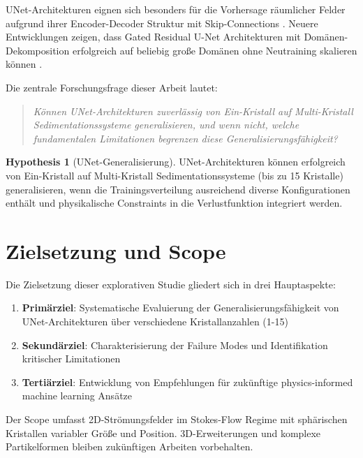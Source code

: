 \documentclass[12pt,twoside,openright]{scrreprt}
\theoremstyle{definition}
\newtheorem{hypothesis}{Hypothesis}[chapter]
\theoremstyle{plain}
\begin{document}
UNet-Architekturen eignen sich besonders für die Vorhersage räumlicher Felder aufgrund ihrer Encoder-Decoder Struktur mit Skip-Connections \parencite{ronneberger2015unet}. Neuere Entwicklungen zeigen, dass Gated Residual U-Net Architekturen mit Domänen-Dekomposition erfolgreich auf beliebig große Domänen ohne Neutraining skalieren können \parencite{rana2024scalable_cnn}.

Die zentrale Forschungsfrage dieser Arbeit lautet:

\begin{quote}
\textit{Können UNet-Architekturen zuverlässig von Ein-Kristall auf Multi-Kristall Sedimentationssysteme generalisieren, und wenn nicht, welche fundamentalen Limitationen begrenzen diese Generalisierungsfähigkeit?}
\end{quote}

\begin{hypothesis}[UNet-Generalisierung]
\label{hyp:generalization}
UNet-Architekturen können erfolgreich von Ein-Kristall auf Multi-Kristall Sedimentationssysteme (bis zu 15 Kristalle) generalisieren, wenn die Trainingsverteilung ausreichend diverse Konfigurationen enthält und physikalische Constraints in die Verlustfunktion integriert werden.
\end{hypothesis}

\section{Zielsetzung und Scope}

Die Zielsetzung dieser explorativen Studie gliedert sich in drei Hauptaspekte:

\begin{enumerate}
	\item \textbf{Primärziel}: Systematische Evaluierung der Generalisierungsfähigkeit von UNet-Architekturen über verschiedene Kristallanzahlen (1-15)
	\item \textbf{Sekundärziel}: Charakterisierung der Failure Modes und Identifikation kritischer Limitationen
	\item \textbf{Tertiärziel}: Entwicklung von Empfehlungen für zukünftige physics-informed machine learning Ansätze
\end{enumerate}

Der Scope umfasst 2D-Strömungsfelder im Stokes-Flow Regime mit sphärischen Kristallen variabler Größe und Position. 3D-Erweiterungen und komplexe Partikelformen bleiben zukünftigen Arbeiten vorbehalten.
\end{document}
